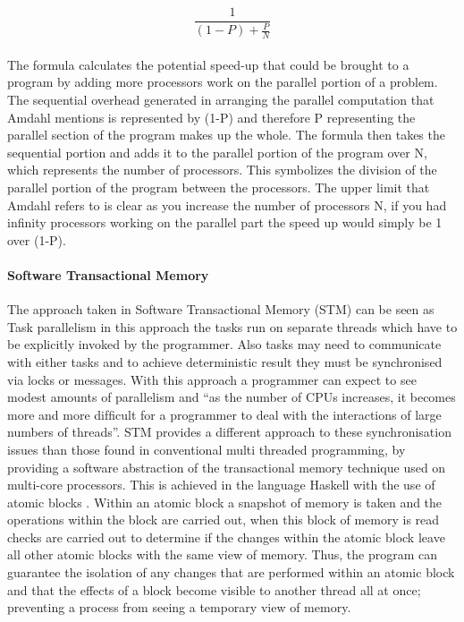 \documentclass[main.tex]{subfiles}
\begin{document}
{{\begin{equation}
\frac{1}{(1-P)+\frac{P}{N}}
\end{equation}

\paragraph{}The formula calculates the potential speed-up that could be brought to a program by adding more processors work on the parallel portion of a problem. The sequential overhead generated in arranging the parallel computation that Amdahl mentions is represented by (1-P) and therefore P representing the parallel section of the program makes up the whole. The formula then takes the sequential portion and adds it to the parallel portion of the program over N, which represents the number of processors. This symbolizes the division of the parallel portion of the program between the processors. The upper limit that Amdahl refers to is clear as you increase the number of processors N, if you had infinity processors working on the parallel part the speed up would simply be 1 over (1-P).
\cite{Amdahl1967}

\paragraph{Software Transactional Memory}The approach taken in Software Transactional Memory (STM) can be seen as Task parallelism in this approach the tasks run on separate threads which have to be explicitly invoked by the programmer. Also tasks may need to communicate with either tasks and to achieve deterministic result they must be synchronised via locks or messages. With this approach a programmer can expect to see modest amounts of parallelism and ``as the number of CPUs increases, it becomes more and more difﬁcult for a programmer to deal with the interactions of large numbers of threads''\cite{Jones2008}. STM provides a different approach to these synchronisation issues than those found in conventional multi threaded programming, by providing a software abstraction of the transactional memory technique used on multi-core processors. This is achieved in the language Haskell with the use of atomic blocks \cite{Harris2005}. Within an atomic block a snapshot of memory is taken and the operations within the block are carried out, when this block of memory is read checks are carried out to determine if the changes within the atomic block leave all other atomic blocks with the same view of memory. Thus, the program can guarantee the isolation of any changes that are performed within an atomic block and that the effects of a block become visible to another thread all at once; preventing a process from seeing a temporary view of memory.

}}
\end{document}
